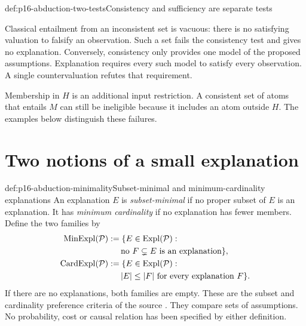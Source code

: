 \begin{hbwarning}{def:p16-abduction-two-tests}{Consistency and sufficiency are separate tests}
\par\nobreak
Classical entailment from an inconsistent set is vacuous: there is no
satisfying valuation to falsify an observation. Such a set fails the
consistency test and gives no explanation. Conversely, consistency only
provides one model of the proposed assumptions. Explanation requires every
such model to satisfy every observation. A single countervaluation refutes
that requirement.

Membership in \(H\) is an additional input restriction. A consistent set
of atoms that entails \(M\) can still be ineligible because it includes
an atom outside \(H\). The examples below distinguish these failures.
\end{hbwarning}

\section{Two notions of a small explanation}
\label{sec:p16-abduction-minimality}

\begin{hbdefinition}{def:p16-abduction-minimality}{Subset-minimal and minimum-cardinality explanations}
An explanation \(E\) is \emph{subset-minimal} if no proper subset of
\(E\) is an explanation. It has \emph{minimum cardinality} if no
explanation has fewer members. Define the two families by
\[
\begin{aligned}
 \operatorname{MinExpl}(\mathcal P)
   &\mathrel{:=}\{E\in\operatorname{Expl}(\mathcal P):\\
   &\hspace{1.5em}\text{no }F\subsetneq E\text{ is an explanation}\},\\
 \operatorname{CardExpl}(\mathcal P)
   &\mathrel{:=}\{E\in\operatorname{Expl}(\mathcal P):\\
   &\hspace{1.5em}|E|\leq|F|\text{ for every explanation }F\}.
\end{aligned}
\]
If there are no explanations, both families are empty. These are the
subset and cardinality preference criteria of the source
\cite[def.~2.3 and following discussion, manuscript pp.~10--11]{EiterGottlobAbductionManuscript}.
They compare sets of assumptions. No probability, cost or causal relation
has been specified by either definition.
\end{hbdefinition}

